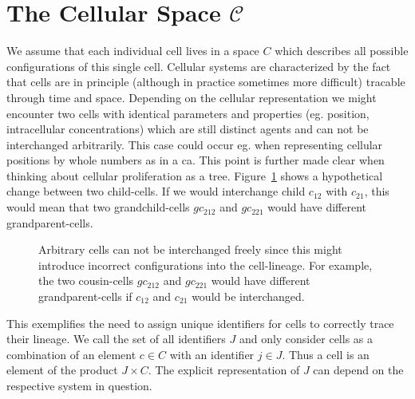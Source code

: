 \documentclass{article}
\begin{document}
\section{The Cellular Space $\mathscr{C}$}
We assume that each individual cell lives in a space $C$ which describes all possible configurations
of this single cell.
Cellular systems are characterized by the fact that cells are in principle (although in
practice sometimes more difficult) tracable through time and space.
Depending on the cellular representation we might encounter two cells with identical parameters and
properties (eg. position, intracellular concentrations) which are still distinct agents and can not
be interchanged arbitrarily.
This case could occur eg. when representing cellular positions by whole numbers as in a
\ac{ca}.
This point is further made clear when thinking about cellular proliferation as a tree.
Figure~\ref{fig:cell-lineage-break} shows a hypothetical change between two child-cells.
If we would interchange child $c_{12}$ with $c_{21}$, this would mean that two grandchild-cells
$gc_{212}$ and $gc_{221}$ would have different grandparent-cells.

\begin{figure}
    \centering
    \caption{
        Arbitrary cells can not be interchanged freely since this might introduce incorrect
        configurations into the cell-lineage.
        For example, the two cousin-cells $gc_{212}$ and $gc_{221}$ would have different
        grandparent-cells if $c_{12}$ and $c_{21}$ would be interchanged.
    }
    \label{fig:cell-lineage-break}
\end{figure}

This exemplifies the need to assign unique identifiers for cells to correctly trace their lineage.
We call the set of all identifiers $J$ and only consider cells as a combination of an element
$c\in C$ with an identifier $j\in J$.
Thus a cell is an element of the product $J\times C$.
The explicit representation of $J$ can depend on the respective system in question.
\end{document}
